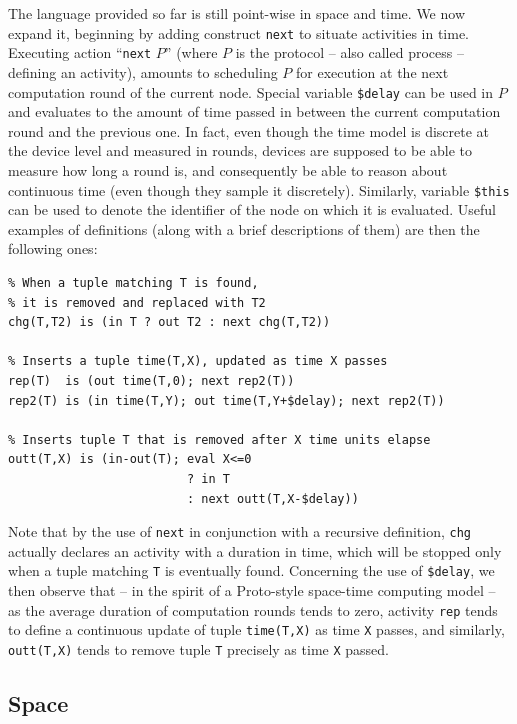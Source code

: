 \documentclass[12pt,a4paper,twoside,openright]{book}
\begin{document}
The language provided so far is still point-wise in space and time.
%
We now expand it, beginning by adding construct \texttt{next} to situate activities in time.
%
Executing action ``\texttt{next} $P$'' (where $P$ is the protocol -- also called process -- defining an activity), amounts to scheduling $P$ for execution at the next computation round of the current node.
%
Special variable \texttt{\$delay} can be used in $P$ and evaluates to the amount of time passed in between the current computation round and the previous one.
%
In fact, even though the time model is discrete at the device level and measured in rounds, devices are supposed to be able to measure how long a round is, and consequently be able to reason about continuous time (even though they sample it discretely).
%
Similarly, variable \texttt{\$this} can be used to denote the identifier of the node on which it is evaluated.
%
Useful examples of definitions (along with a brief descriptions of them) are then the following ones:
{
\begin{verbatim}
% When a tuple matching T is found,
% it is removed and replaced with T2
chg(T,T2) is (in T ? out T2 : next chg(T,T2))

% Inserts a tuple time(T,X), updated as time X passes
rep(T) 	is (out time(T,0); next rep2(T))
rep2(T) is (in time(T,Y); out time(T,Y+$delay); next rep2(T))

% Inserts tuple T that is removed after X time units elapse
outt(T,X) is (in-out(T); eval X<=0
                         ? in T
                         : next outt(T,X-$delay))
\end{verbatim}
}

\noindent Note that by the use of \texttt{next} in conjunction with a recursive definition, \texttt{chg} actually declares an activity with a duration in time, which will be stopped only when a tuple matching \texttt{T} is eventually found.
%
Concerning the use of \texttt{\$delay}, we then observe that -- in the spirit of a Proto-style space-time computing model -- as the average duration of computation rounds tends to zero, activity \texttt{rep} tends to define a continuous update of tuple \texttt{time(T,X)} as time \texttt{X} passes, and similarly, \texttt{outt(T,X)} tends to remove tuple \texttt{T} precisely as time \texttt{X} passed.

\subsection{Space}
\end{document}

